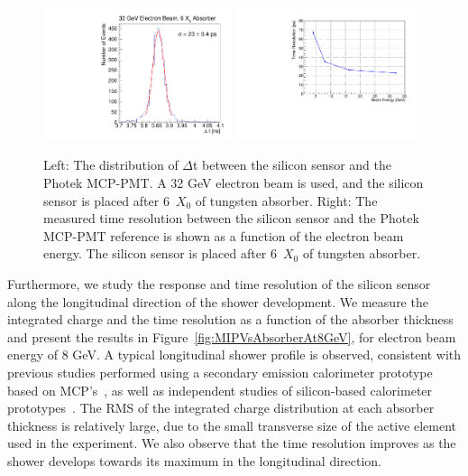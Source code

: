 \documentclass[preprint,1p]{elsarticle}
\begin{document}
\begin{figure}[htbp] 
\centering
\includegraphics[width=0.49\textwidth]{plots/deltaT_32GeV_6X0.pdf} 
\includegraphics[width=0.49\textwidth]{plots/SigmaT_vs_BeamEnergy_lin30Stamp.pdf} 
\caption{Left: The distribution of $\Delta$t between the silicon sensor and the
Photek MCP-PMT. A 32 GeV electron beam is used, and the silicon sensor is placed
after 6~$X_0$ of tungsten absorber. Right: The measured time resolution between
the silicon sensor and the Photek MCP-PMT reference is shown as a function of
the electron beam energy. The silicon sensor is placed after 6~$X_0$ of
tungsten absorber. } 
\label{fig:MIPVsEnergy} 
\end{figure} 

Furthermore, we study the response and time resolution of the silicon sensor
along the longitudinal direction of the shower development. We measure the
integrated charge and the time resolution as a function of the absorber
thickness and present the results in Figure~\ref{fig:MIPVsAbsorberAt8GeV}, for
electron beam energy of 8 GeV. A typical longitudinal shower profile is
observed, consistent with previous studies performed using a secondary emission
calorimeter prototype based on MCP's~\cite{Ronzhin2015288}, as well as
independent studies of silicon-based calorimeter prototypes~\cite{Muhuri201424}.
The RMS of the integrated charge distribution at each absorber thickness is
relatively large, due to the small transverse size of the active element used in
the experiment. We also observe that the time resolution improves as the shower
develops towards its maximum in the longitudinal direction. 
\end{document}

